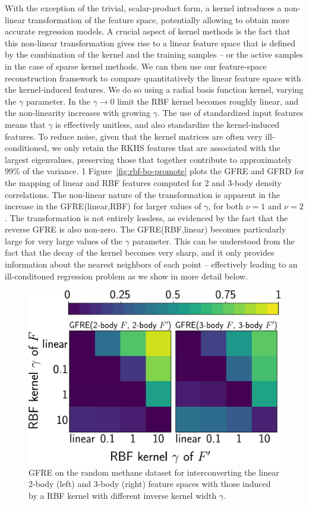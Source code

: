 With the exception of the trivial, scalar-product form, a kernel introduces a non-linear transformation of the feature space, potentially allowing to obtain more accurate regression models. 
A crucial aspect of kernel methods is the fact that this non-linear transformation gives rise to a linear feature space that is defined by the combination of the kernel and the training samples -- or the active samples in the case of sparse kernel methods.
We can then use our feature-space reconstruction framework to compare quantitatively the linear feature space with the kernel-induced features. We do so using a radial basis function kernel, varying the $\gamma$ parameter. In the $\gamma\rightarrow 0$ limit the RBF kernel becomes roughly linear, and the non-linearity increases with growing $\gamma$. The use of standardized input features means that $\gamma$ is effectively unitless, and also standardize the kernel-induced features. 
To reduce noise, given that the kernel matrices are often very ill-conditioned, we only retain the RKHS features that are associated with the largest eigenvalues, preserving those that together contribute to approximately 99\%{} of the variance.
1
Figure~\ref{fig:rbf-bo-promote} plots the GFRE and GFRD for the mapping of linear and RBF features computed for 2 and 3-body density correlations. The non-linear nature of the transformation is apparent in the increase in the GFRE(linear,RBF) for larger values of $\gamma$, for both $\nu=1$ and $\nu=2$. The transformation is not entirely lossless, as evidenced by the fact that the reverse GFRE is also non-zero. The GFRE(RBF,linear) becomes particularly large for very large values of the $\gamma$ parameter. This can be understood from the fact that the decay of the kernel becomes very sharp, and it only provides information about the nearest neighbors of each point -- effectively leading to an ill-conditoned regression problem as we show in more detail below. 

\begin{figure}
    \centering
    \includegraphics[width=0.7\linewidth]{fig/rof/body_order_comparison-gfrm-rs_ps-methane-inkscaped-v3-fixed_rkhs_features.pdf}
    \caption{GFRE on the random methane dataset for interconverting the linear 2-body (left) and 3-body (right) feature spaces with those induced by a RBF kernel with different inverse  kernel width $\gamma$.}
    \label{fig:rbf-density}
\end{figure}

